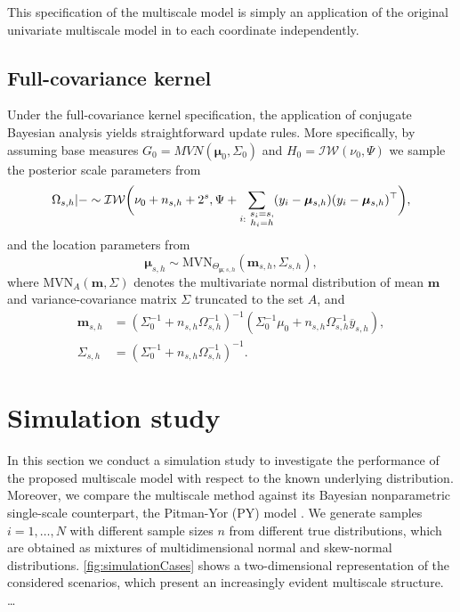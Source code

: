 \documentclass[nonatbib]{elsarticle}
\begin{document}
This specification of the multiscale model is simply an application of the original univariate multiscale model in \autocite{stefanucci2021} to each coordinate independently.

\subsection{Full-covariance kernel}\label{ssec:full-covariance-kernel}
Under the full-covariance kernel specification, the application of conjugate Bayesian analysis yields straightforward update rules.
More specifically, by assuming base measures $G_0 = MVN(\bm{\mu}_0, \Sigma_0)$ and $H_0 = \mathcal{IW}(\nu_0, \Psi)$ we sample the posterior scale parameters from
\[
    \Omega_{s,h} | - \sim \mathcal{IW}\bigg(\nu_0 + n_{s,h} + 2^{s}, \Psi + \sum_{i :\ \substack{s_i = s,\\h_i = h}} (y_i - \bm{\mu}_{s,h})(y_i - \bm{\mu}_{s,h})^\top \bigg),
\]
and the location parameters from
\[
    \bm{\mu}_{s,h} \sim \text{MVN}_{\Theta_{\bm{\mu};s,h}}\left( \bm{m}_{s,h}, \Sigma_{s,h} \right),
\]
where $\text{MVN}_A(\bm{m}, \Sigma)$ denotes the multivariate normal distribution of mean $\bm{m}$ and variance-covariance matrix $\Sigma$ truncated to the set $A$, and
\[
    \begin{aligned}
        \bm{m}_{s,h} & = (\Sigma_0^{-1} + n_{s,h}\Omega_{s,h}^{-1} )^{-1} (\Sigma_0^{-1} \mu_0 + n_{s,h}\Omega_{s,h}^{-1} \overbar{y}_{s,h}),\\
        \Sigma_{s,h} &= (\Sigma_0^{-1} + n_{s,h} \Omega_{s,h}^{-1})^{-1}.
    \end{aligned}
\]


\section{Simulation study}\label{sec:application}
In this section we conduct a simulation study to investigate the performance of the proposed multiscale model with respect to the known underlying distribution.
Moreover, we compare the multiscale method against its Bayesian nonparametric single-scale counterpart, the Pitman-Yor (PY) model \autocite{pitman1997}.
We generate samples $i = 1, \ldots, N$ with different sample sizes $n$ from different true distributions, which are obtained as mixtures of multidimensional normal and skew-normal distributions.
\autoref{fig:simulationCases} shows a two-dimensional representation of the considered scenarios, which present an increasingly evident multiscale structure.
\ldots
\end{document}
